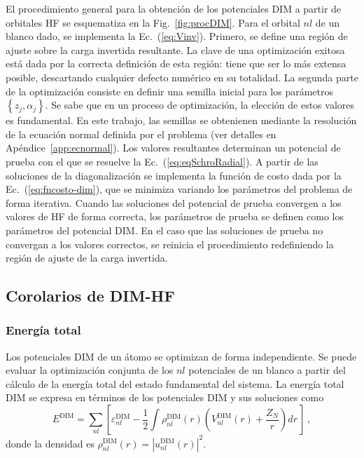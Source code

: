 El procedimiento general para la obtención de los potenciales DIM a 
partir de orbitales HF se esquematiza en la Fig.~\ref{fig:procDIM}. Para 
el orbital $nl$ de un blanco dado, se implementa la Ec.~(\ref{eq:Vinv}). 
Primero, se define una región de ajuste sobre la carga invertida 
resultante. La clave de una optimización exitosa está dada por la 
correcta definición de esta región: tiene que ser lo más extensa 
posible, descartando cualquier defecto numérico en su totalidad. 
La segunda parte de la optimización consiste en definir una 
semilla inicial para los parámetros $\left\{z_j,\alpha_j\right\}$. Se 
sabe que en un proceso de optimización, la elección de estos valores es 
fundamental. En este trabajo, las semillas se obtenienen mediante la 
resolución de la ecuación normal definida por el problema (ver detalles 
en Apéndice~\ref{app:ecnormal}). Los valores resultantes determinan un 
potencial de prueba con el que se resuelve la 
Ec.~(\ref{eq:eqSchroRadial}). 
A partir de las soluciones de la diagonalización se implementa la 
función de costo dada por la Ec.~(\ref{eq:fncosto-dim}), que se minimiza 
variando los parámetros del problema de forma iterativa. Cuando las 
soluciones del potencial de prueba convergen a los valores de HF de 
forma correcta, los parámetros de prueba se definen como los parámetros 
del potencial DIM. En el caso que las soluciones de prueba no convergan 
a los valores correctos, se reinicia el procedimiento redefiniendo la 
región de ajuste de la carga invertida.

\subsection{Corolarios de DIM-HF}
\label{sec:corolarios}

\subsubsection*{Energía total}

Los potenciales DIM de un átomo se optimizan de forma independiente. Se 
puede evaluar la optimización conjunta de los $nl$ potenciales de un 
blanco a partir del cálculo de la energía total del estado fundamental 
del sistema. La energía total DIM se expresa en términos de los 
potenciales DIM y sus soluciones como
\begin{equation}
E^{\mathrm{DIM}} = \sum\limits_{nl} 
\left[ 
\varepsilon_{nl}^{\mathrm{DIM}} - 
\frac{1}{2}\int  \rho_{nl}^{\mathrm{DIM}}(r)
\left( V_{nl}^{\mathrm{DIM}}(r) + \frac{Z_{N}}{r}\right) dr \,
\right] \, ,
\label{eq:Etotal}
\end{equation}
donde la densidad es 
$\rho_{nl}^{\mathrm{DIM}}(r)=|u_{nl}^{\mathrm{DIM}}(r)|^2$. 


